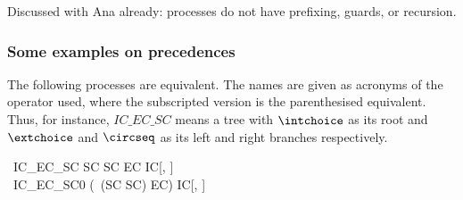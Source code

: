 \documentclass{article}
\begin{document}


\begin{issue}
    Discussed with Ana already: processes do not have prefixing, guards, or recursion.
\end{issue}

\subsubsection{Some examples on precedences}

The following processes are equivalent. The names are given as acronyms of
the operator used, where the subscripted version is the parenthesised equivalent.
Thus, for instance, $IC\_EC\_SC$ means a tree with $\intchoice$ as its root and
$\extchoice$ and $\circseq$ as its left and right branches respectively.
%
\begin{circus}
    \circprocess\ IC\_EC\_SC   \circdef SC \circseq SC \extchoice EC \intchoice IC[\nat, \nat] \\
    \circprocess\ IC\_EC\_SC0 \circdef (~(SC \circseq SC) \extchoice EC) \intchoice IC[\nat, \nat]
\end{circus}
%
\end{document}
